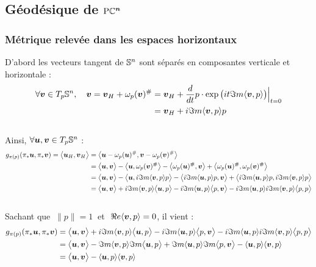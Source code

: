 \subsection{Géodésique de $\bf{\PC{n}}$} \label{ann:geode2PC^n}

\subsubsection{Métrique relevée dans les espaces horizontaux}

D'abord les vecteurs tangent de $\S{n}$ sont séparés en composantes verticale et horizontale :
\begin{align}
	\forall \bf{v}\in \tg[p]{\S{n}},\quad \bf{v} = \bf{v}_H + \omega_p(\bf{v})^\# &= \bf{v}_H + \frac{d}{dt}p\cdot \exp\big(it\Im m \langle \bf{v}, p \rangle\big)\Big|_{t=0} \\
	&= \bf{v}_H  + i\Im m \langle \bf{v}, p \rangle p
\end{align}
\\
Ainsi, $\forall \bf{u},\bf{v}\in \tg[p]{\S{n}}$ :
\begin{align*}
	g_{\pi(p)}( \pi_*\bf{u}, \pi_*\bf{v}) = \big\langle \bf{u}_H, \bf{v}_H \big\rangle &= \big\langle\bf{u} - \conn_p(\bf{u})^\#, \bf{v} - \conn_p(\bf{v})^\# \big\rangle \\
	&= \big\langle\bf{u}, \bf{v} \big\rangle  - \big\langle\bf{u}, \conn_p(\bf{v})^\# \big\rangle - \big\langle \conn_p(\bf{u})^\#, \bf{v} \big\rangle + \big\langle \conn_p(\bf{u})^\#, \conn_p(\bf{v})^\# \big\rangle \\
	&= \big\langle\bf{u}, \bf{v} \big\rangle  - \big\langle\bf{u},  i\Im m \langle \bf{v}, p \rangle p \big\rangle - \big\langle  i\Im m \langle \bf{u}, p \rangle p, \bf{v} \big\rangle + \big\langle  i\Im m \langle \bf{u}, p \rangle p,  i\Im m \langle \bf{v}, p \rangle p \big\rangle \\
	&= \big\langle\bf{u}, \bf{v} \big\rangle  + i\Im m \langle \bf{v}, p \rangle\big\langle\bf{u}, p \big\rangle - i\Im m \langle \bf{u}, p \rangle\big\langle p, \bf{v} \big\rangle - i\Im m \langle \bf{u}, p \rangle i\Im m \langle \bf{v}, p \rangle \big\langle p, p \big\rangle
\end{align*}
\\
Sachant que $\ \|p\|=1\ $ et $\ \Re e \langle \bf{v},p\rangle = 0$, il vient :
\begin{align*}
	g_{\pi(p)}( \pi_*\bf{u}, \pi_*\bf{v}) 
	&= \big\langle\bf{u}, \bf{v} \big\rangle  + i\Im m \langle \bf{v}, p \rangle\big\langle\bf{u}, p \big\rangle - i\Im m \langle \bf{u}, p \rangle\big\langle p, \bf{v} \big\rangle - i\Im m \langle \bf{u}, p \rangle i\Im m \langle \bf{v}, p \rangle \big\langle p, p \big\rangle \\
	&= \big\langle\bf{u}, \bf{v} \big\rangle  -\Im m \langle \bf{v}, p \rangle \Im m\big\langle\bf{u}, p \big\rangle + \Im m \langle \bf{u}, p \rangle \Im m \big\langle p, \bf{v} \big\rangle - \langle \bf{u}, p \rangle \langle \bf{v}, p \rangle\\
	&= \big\langle\bf{u}, \bf{v} \big\rangle -  \langle \bf{u}, p \rangle \langle \bf{v}, p \rangle
\end{align*}

